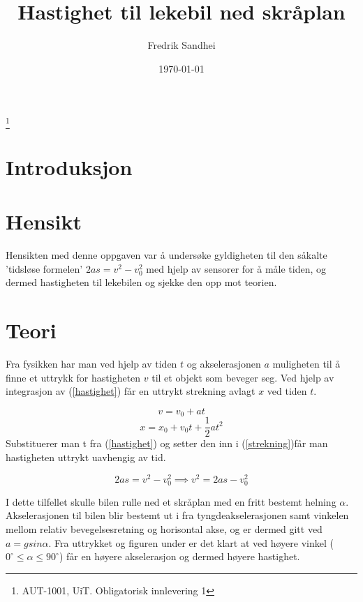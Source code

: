 \documentclass[11pt, a4paper]{article}
\begin{document}
\title{Hastighet til lekebil ned skråplan}
\author{Fredrik Sandhei}
\date{\today}
\maketitle
\footnote{AUT-1001, UiT. Obligatorisk innlevering 1}
\newpage
\tableofcontents
\newpage

\section{Introduksjon}

\section{Hensikt}
Hensikten med denne oppgaven var å undersøke gyldigheten til den såkalte 'tidsløse formelen' $ 2as = v^{2} - v_{0}^{2} $ med hjelp av sensorer for å måle tiden, og dermed hastigheten til lekebilen og sjekke den opp mot teorien.

\section{Teori}
Fra fysikken har man ved hjelp av tiden $t$ og akselerasjonen $a$ muligheten til å finne et uttrykk for hastigheten $v$ til et objekt som beveger seg. Ved hjelp av integrasjon av (\ref{hastighet}) får en uttrykt strekning avlagt $x$ ved tiden $t$.

\begin{equation} \label{hastighet}
v = v_{0} + at
\end{equation}
\begin{equation} \label{strekning}
x = x_{0} + v_{0}t + \frac{1}{2}at^{2}
\end{equation}
Substituerer man t fra (\ref{hastighet}) og setter den inn i (\ref{strekning})får man hastigheten uttrykt uavhengig av tid.

\begin{equation}
2as = v^{2}-v_{0}^{2} \implies v^{2} = 2as-v_{0}^{2}
\end{equation}
\newline

I dette tilfellet skulle bilen rulle ned et skråplan med en fritt bestemt helning $\alpha$. Akselerasjonen til bilen blir bestemt ut i fra tyngdeakselerasjonen samt vinkelen mellom relativ bevegelsesretning og horisontal akse, og er dermed gitt ved $a = gsin \alpha$. Fra uttrykket og figuren under er det klart at ved høyere vinkel ($0^\circ \leq\alpha\leq 90^\circ$) får en høyere akselerasjon og dermed høyere hastighet.\newline
\end{document}

